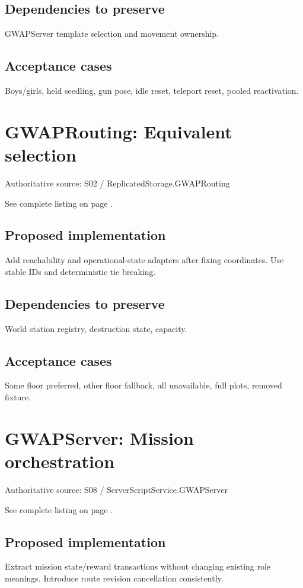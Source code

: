 \subsection{Dependencies to preserve}
GWAPServer template selection and movement ownership.\allowbreak{}

\subsection{Acceptance cases}
Boys/\allowbreak{}girls, held seedling, gun pose, idle reset, teleport reset, pooled reactivation.\allowbreak{}

\section{GWAPRouting: Equivalent selection}
Authoritative source: S02 /\allowbreak{} ReplicatedStorage.\allowbreak{}GWAPRouting

See complete listing on page \pageref{src:S02}.

\subsection{Proposed implementation}
Add reachability and operational-state adapters after fixing coordinates.\allowbreak{} Use stable IDs and deterministic tie breaking.\allowbreak{}

\subsection{Dependencies to preserve}
World station registry, destruction state, capacity.\allowbreak{}

\subsection{Acceptance cases}
Same floor preferred, other floor fallback, all unavailable, full plots, removed fixture.\allowbreak{}

\section{GWAPServer: Mission orchestration}
Authoritative source: S08 /\allowbreak{} ServerScriptService.\allowbreak{}GWAPServer

See complete listing on page \pageref{src:S08}.

\subsection{Proposed implementation}
Extract mission state/\allowbreak{}reward transactions without changing existing role meanings.\allowbreak{} Introduce route revision cancellation consistently.\allowbreak{}

